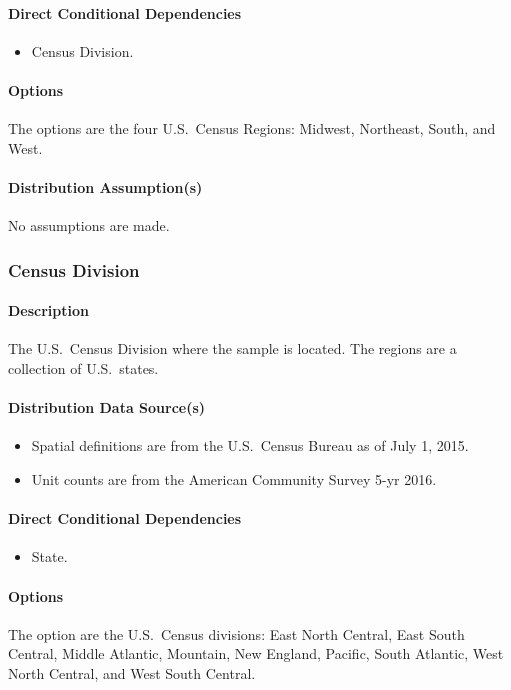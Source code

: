 \paragraph{Direct Conditional Dependencies}
\begin{itemize} 
\item Census Division.
\end{itemize}

\paragraph{Options}
The options are the four U.S.~Census Regions: Midwest, Northeast, South, and West.

\paragraph{Distribution Assumption(s)}
No assumptions are made.

\subsubsection{Census Division}
\paragraph{Description}
The U.S.~Census Division where the sample is located. The regions are a collection of U.S.~states.

\paragraph{Distribution Data Source(s)}
\begin{itemize} 
\item
  Spatial definitions are from the U.S.~Census Bureau as of July 1,
  2015.
\item
  Unit counts are from the American Community Survey 5-yr 2016.
\end{itemize}

\paragraph{Direct Conditional Dependencies}
\begin{itemize} 
\item State.
\end{itemize}

\paragraph{Options}
The option are the U.S.~Census divisions: East North Central, East South Central, Middle Atlantic, Mountain, New England, Pacific, South Atlantic, West North Central, and West South Central.

